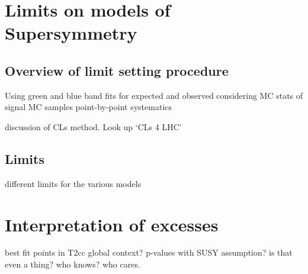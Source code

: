 \section{Limits on models of Supersymmetry}  %
\label{sec:interpretation_limits}

\subsection{Overview of limit setting procedure}
Using green and blue band fits for expected and observed
considering MC stats of signal MC samples
point-by-point systematics

discussion of CLs method. Look up `CLs 4 LHC'

\subsection{Limits}
different limits for the various models


\section{Interpretation of excesses}
\label{sec:interpretation_excess}
best fit points in T2cc
global context?
p-values with SUSY assumption? is that even a thing? who knows? who cares.